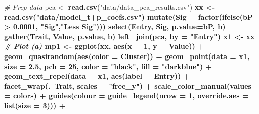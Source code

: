 \documentclass[
]{article}
\newenvironment{Shaded}{\begin{snugshade}}{\end{snugshade}}
\newcommand{\CommentTok}[1]{\textcolor[rgb]{0.56,0.35,0.01}{\textit{#1}}}
\newcommand{\DataTypeTok}[1]{\textcolor[rgb]{0.13,0.29,0.53}{#1}}
\newcommand{\DecValTok}[1]{\textcolor[rgb]{0.00,0.00,0.81}{#1}}
\newcommand{\FloatTok}[1]{\textcolor[rgb]{0.00,0.00,0.81}{#1}}
\newcommand{\KeywordTok}[1]{\textcolor[rgb]{0.13,0.29,0.53}{\textbf{#1}}}
\newcommand{\NormalTok}[1]{#1}
\newcommand{\OperatorTok}[1]{\textcolor[rgb]{0.81,0.36,0.00}{\textbf{#1}}}
\newcommand{\StringTok}[1]{\textcolor[rgb]{0.31,0.60,0.02}{#1}}
\begin{document}
\begin{Shaded}
\begin{Highlighting}[]
\CommentTok{# Prep data}
\NormalTok{pca <-}\StringTok{ }\KeywordTok{read.csv}\NormalTok{(}\StringTok{"data/data_pca_results.csv"}\NormalTok{) }\OperatorTok{%
\NormalTok{xx <-}\StringTok{ }\KeywordTok{read.csv}\NormalTok{(}\StringTok{"data/model_t+p_coefs.csv"}\NormalTok{) }\OperatorTok{%
\StringTok{  }\KeywordTok{mutate}\NormalTok{(}\DataTypeTok{Sig =} \KeywordTok{factor}\NormalTok{(}\KeywordTok{ifelse}\NormalTok{(bP }\OperatorTok{>}\StringTok{ }\FloatTok{0.0001}\NormalTok{, }\StringTok{"Sig"}\NormalTok{,}\StringTok{"Less Sig"}\NormalTok{))) }\OperatorTok{%
\StringTok{  }\KeywordTok{select}\NormalTok{(Entry, Sig, }\DataTypeTok{p.value=}\NormalTok{bP, b) }\OperatorTok{%
\StringTok{  }\KeywordTok{gather}\NormalTok{(Trait, Value, p.value, b) }\OperatorTok{%
\StringTok{  }\KeywordTok{left_join}\NormalTok{(pca, }\DataTypeTok{by =} \StringTok{"Entry"}\NormalTok{)}
\NormalTok{x1 <-}\StringTok{ }\NormalTok{xx }\OperatorTok{%
\CommentTok{# Plot (a)}
\NormalTok{mp1 <-}\StringTok{ }\KeywordTok{ggplot}\NormalTok{(xx, }\KeywordTok{aes}\NormalTok{(}\DataTypeTok{x =} \DecValTok{1}\NormalTok{, }\DataTypeTok{y =}\NormalTok{ Value)) }\OperatorTok{+}
\StringTok{  }\KeywordTok{geom_quasirandom}\NormalTok{(}\KeywordTok{aes}\NormalTok{(}\DataTypeTok{color =}\NormalTok{ Cluster)) }\OperatorTok{+}
\StringTok{    }\KeywordTok{geom_point}\NormalTok{(}\DataTypeTok{data =}\NormalTok{ x1, }\DataTypeTok{size =} \FloatTok{2.5}\NormalTok{, }\DataTypeTok{pch =} \DecValTok{25}\NormalTok{, }\DataTypeTok{color =} \StringTok{"black"}\NormalTok{, }\DataTypeTok{fill =} \StringTok{"darkblue"}\NormalTok{) }\OperatorTok{+}
\StringTok{  }\KeywordTok{geom_text_repel}\NormalTok{(}\DataTypeTok{data =}\NormalTok{ x1, }\KeywordTok{aes}\NormalTok{(}\DataTypeTok{label =}\NormalTok{ Entry)) }\OperatorTok{+}
\StringTok{  }\KeywordTok{facet_wrap}\NormalTok{(.}\OperatorTok{~}\NormalTok{Trait, }\DataTypeTok{scales =} \StringTok{"free_y"}\NormalTok{) }\OperatorTok{+}
\StringTok{  }\KeywordTok{scale_color_manual}\NormalTok{(}\DataTypeTok{values =}\NormalTok{ colors) }\OperatorTok{+}
\StringTok{  }\KeywordTok{guides}\NormalTok{(}\DataTypeTok{colour =} \KeywordTok{guide_legend}\NormalTok{(}\DataTypeTok{nrow =} \DecValTok{1}\NormalTok{, }\DataTypeTok{override.aes =} \KeywordTok{list}\NormalTok{(}\DataTypeTok{size =} \DecValTok{3}\NormalTok{))) }\OperatorTok{+}
}}}}}}
\end{Highlighting}
\end{Shaded}
\end{document}
